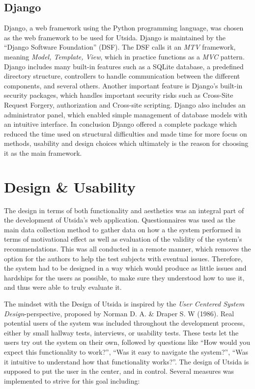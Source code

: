 \subsection{Django}\label{sec:django}
 Django\cite{djangodocs}, a web framework using the Python programming language, was chosen as the web framework to be used for Utsida. Django is maintained by the \enquote{Django Software Foundation} (DSF). The DSF calls it an \emph{MTV} framework, meaning \emph{Model, Template, View}, which in practice functions as a \emph{MVC} pattern. Django includes many built-in features such as a SQLite database, a predefined directory structure, controllers to handle communication between the different components, and several others. Another important feature is Django's built-in security packages, which handles important security risks such as Cross-Site Request Forgery, authorization and Cross-site scripting. Django also includes an administrator panel, which enabled simple management of database models with an intuitive interface. In conclusion Django offered a complete package which reduced the time used on structural difficulties and made time for more focus on methods, usability and design choices which ultimately is the reason for choosing it as the main framework.


 
\section{Design \& Usability}
The design in terms of both functionality and aesthetics was an integral part of the development of Utsida's web application. Questionnaires was used as the main data collection method to gather data on how a the system performed in terms of motivational effect as well as evaluation of the validity of the system's recommendations. This was all conducted in a remote manner, which removes the option for the authors to help the test subjects with eventual issues. Therefore, the system had to be designed in a way which would produce as little issues and hardships for the users as possible, to make sure they understood how to use it, and thus were able to truly evaluate it.

The mindset with the Design of Utsida is inspired by the \emph{User Centered System Design}-perspective, proposed by Norman D. A. \& Draper S. W (1986)\cite{norman1986user}. Real potential users of the system was included throughout the development process, either by small hallway tests, interviews, or usability tests. These tests let the users try out the system on their own, followed by questions like \enquote{How would you expect this functionality to work?}, \enquote{Was it easy to navigate the system?}, \enquote{Was it intuitive to understand how that functionality works?}. The design of Utsida is supposed to put the user in the center, and in control. Several measures was implemented to strive for this goal including:

